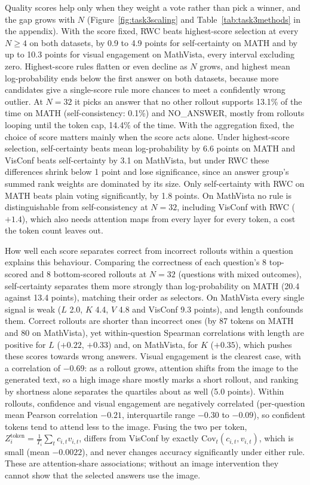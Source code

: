 Quality scores help only when they weight a vote rather than pick a winner, and the gap grows with $N$ (Figure~\ref{fig:task3scaling} and Table~\ref{tab:task3methods} in the appendix). With the score fixed, RWC beats highest-score selection at every $N\geq4$ on both datasets, by 0.9 to 4.9 points for self-certainty on MATH and by up to 10.3 points for visual engagement on MathVista, every interval excluding zero. Highest-score rules flatten or even decline as $N$ grows, and highest mean log-probability ends below the first answer on both datasets, because more candidates give a single-score rule more chances to meet a confidently wrong outlier. At $N=32$ it picks an answer that no other rollout supports 13.1\% of the time on MATH (self-consistency: 0.1\%) and NO\_ANSWER, mostly from rollouts looping until the token cap, 14.4\% of the time. With the aggregation fixed, the choice of score matters mainly when the score acts alone. Under highest-score selection, self-certainty beats mean log-probability by 6.6 points on MATH and VisConf beats self-certainty by 3.1 on MathVista, but under RWC these differences shrink below 1 point and lose significance, since an answer group's summed rank weights are dominated by its size. Only self-certainty with RWC on MATH beats plain voting significantly, by 1.8 points. On MathVista no rule is distinguishable from self-consistency at $N=32$, including VisConf with RWC ($+1.4$), which also needs attention maps from every layer for every token, a cost the token count leaves out.

How well each score separates correct from incorrect rollouts within a question explains this behaviour. Comparing the correctness of each question's 8 top-scored and 8 bottom-scored rollouts at $N=32$ (questions with mixed outcomes), self-certainty separates them more strongly than log-probability on MATH (20.4 against 13.4 points), matching their order as selectors. On MathVista every single signal is weak ($L$ 2.0, $K$ 4.4, $V$ 4.8 and VisConf 9.3 points), and length confounds them. Correct rollouts are shorter than incorrect ones (by 87 tokens on MATH and 80 on MathVista), yet within-question Spearman correlations with length are positive for $L$ ($+0.22$, $+0.33$) and, on MathVista, for $K$ ($+0.35$), which pushes these scores towards wrong answers. Visual engagement is the clearest case, with a correlation of $-0.69$: as a rollout grows, attention shifts from the image to the generated text, so a high image share mostly marks a short rollout, and ranking by shortness alone separates the quartiles about as well (5.0 points). Within rollouts, confidence and visual engagement are negatively correlated (per-question mean Pearson correlation $-0.21$, interquartile range $-0.30$ to $-0.09$), so confident tokens tend to attend less to the image. Fusing the two per token, $Z^{\mathrm{token}}_i=\frac{1}{T_i}\sum_tc_{i,t}v_{i,t}$, differs from VisConf by exactly $\mathrm{Cov}_t(c_{i,t},v_{i,t})$, which is small (mean $-0.0022$), and never changes accuracy significantly under either rule. These are attention-share associations; without an image intervention they cannot show that the selected answers use the image.

